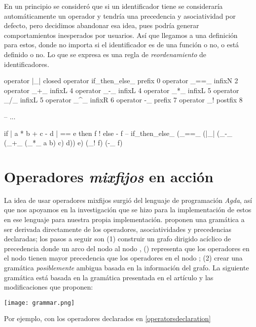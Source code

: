 \begin{designfr}
En un principio se consideró que si un identificador tiene \inlinecode{\_} se consideraría automáticamente un operador y tendría una precedencia y asociatividad por defecto, pero decidimos abandonar esa idea, pues podría generar comportamientos inesperados por usuarios. Así que llegamos a una definición para estos, donde no importa si el identificador es de una función o no, o está definido o no. Lo que se expresa es una regla de \emph{reordenamiento} de identificadores.

\begin{anglercode}
operator |_|                closed
operator if_then_else_      prefix  0
operator _==_               infixN  2
operator _+_                infixL  4
operator _-_                infixL  4
operator _*_                infixL  5
operator _/_                infixL  5
operator _^_                infixR  6
operator -_                 prefix  7
operator _!                 postfix 8

-- ...

if | a * b + c - d | == e then f ! else - f
-- if_then_else_ (_==_ (|_| (_-_ (_+_ (_*_ a b) c) d)) e) (_! f) (-_ f)
\end{anglercode}
\label{operatorsdeclaration}
\end{designfr}

\section{Operadores \emph{mixfijos} en acción}

\begin{investigationfr}
La idea de usar operadores mixfijos surgió del lenguaje de programación \emph{Agda}, así que nos apoyamos en la investigación que se hizo para la implementación de estos en ese lenguaje para nuestra propia implementación. \cite{mixfix} proponen una gramática a ser derivada directamente de los operadores, asociatividades y precedencias declaradas; los pasos a seguir son (1) construir un grafo dirigido acíclico de precedencia donde un arco del nodo  al nodo , () representa que los operadores en el nodo  tienen mayor precedencia que los operadores en el nodo ; (2) crear una gramática \emph{posiblemente} ambigua basada en la información del grafo. La siguiente gramática está basada en la gramática presentada en el artículo y las modificaciones que proponen:

\begin{center}
\texttt{[image: grammar.png]}
\label{imagen:grammar}
\end{center}

Por ejemplo, con los operadores declarados en \ref{operatorsdeclaration}
\end{investigationfr}

